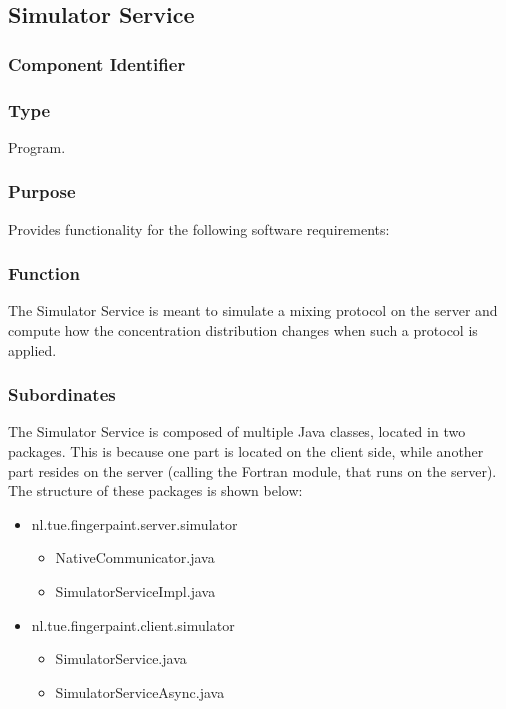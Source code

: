 \subsection{Simulator Service}
\label{subsec:simulatorservice}

\subsubsection*{Component Identifier}
\RTMSSS{}

\subsubsection*{Type}
Program.

\subsubsection*{Purpose}
Provides functionality for the following software requirements:

\noindent {}

\subsubsection*{Function}
The Simulator Service is meant to simulate a mixing protocol on the server and compute how the concentration distribution changes when such a protocol is applied.

\subsubsection*{Subordinates}
The Simulator Service is composed of multiple Java classes, located in two packages. This is because one part is located on the client side, while another part resides on the server (calling the Fortran module, that runs on the server). The structure of these packages is shown below:
\begin{itemize}
	\item nl.tue.fingerpaint.server.simulator
		\begin{itemize}
			\item NativeCommunicator.java
			\item SimulatorServiceImpl.java
		\end{itemize}
	
	\item nl.tue.fingerpaint.client.simulator
		\begin{itemize}
			\item SimulatorService.java
			\item SimulatorServiceAsync.java
		\end{itemize}
\end{itemize}

